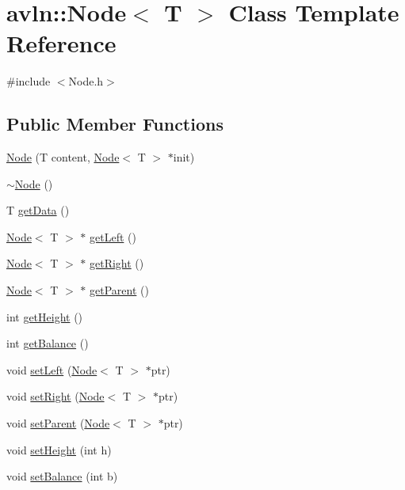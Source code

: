 \hypertarget{classavln_1_1_node}{}\section{avln\+:\+:Node$<$ T $>$ Class Template Reference}
\label{classavln_1_1_node}


{\ttfamily \#include $<$Node.\+h$>$}

\subsection*{Public Member Functions}
\begin{DoxyCompactItemize}
\item 
\hyperlink{classavln_1_1_node_ae6b9042b14a3f43edf699ac07cc65e3b}{Node} (T content, \hyperlink{classavln_1_1_node}{Node}$<$ T $>$ $\ast$init)
\item 
\hyperlink{classavln_1_1_node_a6e466d5cc1ca6e39532a4df8c416f723}{$\sim$\+Node} ()
\item 
T \hyperlink{classavln_1_1_node_a952cbab61543d622bfe13beb872322a0}{get\+Data} ()
\item 
\hyperlink{classavln_1_1_node}{Node}$<$ T $>$ $\ast$ \hyperlink{classavln_1_1_node_ad39cf45af29db3be415f812495c1c201}{get\+Left} ()
\item 
\hyperlink{classavln_1_1_node}{Node}$<$ T $>$ $\ast$ \hyperlink{classavln_1_1_node_ae6e852e00c029d06ae34c0a415a13812}{get\+Right} ()
\item 
\hyperlink{classavln_1_1_node}{Node}$<$ T $>$ $\ast$ \hyperlink{classavln_1_1_node_a1be09de9cacda10a467811b05488bc53}{get\+Parent} ()
\item 
int \hyperlink{classavln_1_1_node_a6f7ca47990ff821955174da329a2c899}{get\+Height} ()
\item 
int \hyperlink{classavln_1_1_node_aac2c46342a8952879b1bfc80e2ceea12}{get\+Balance} ()
\item 
void \hyperlink{classavln_1_1_node_a389bcc50e814497224433b8b4a342d7c}{set\+Left} (\hyperlink{classavln_1_1_node}{Node}$<$ T $>$ $\ast$ptr)
\item 
void \hyperlink{classavln_1_1_node_a9e0028d2c32e058af743b053d4705094}{set\+Right} (\hyperlink{classavln_1_1_node}{Node}$<$ T $>$ $\ast$ptr)
\item 
void \hyperlink{classavln_1_1_node_a2066d3e947f28ca659a14bc3077bd5b5}{set\+Parent} (\hyperlink{classavln_1_1_node}{Node}$<$ T $>$ $\ast$ptr)
\item 
void \hyperlink{classavln_1_1_node_adb40e177e84b957e1d0230b057ec8bf9}{set\+Height} (int h)
\item 
void \hyperlink{classavln_1_1_node_a8a1ed38ddc9e92d25981389af32d7cf4}{set\+Balance} (int b)
\end{DoxyCompactItemize}


